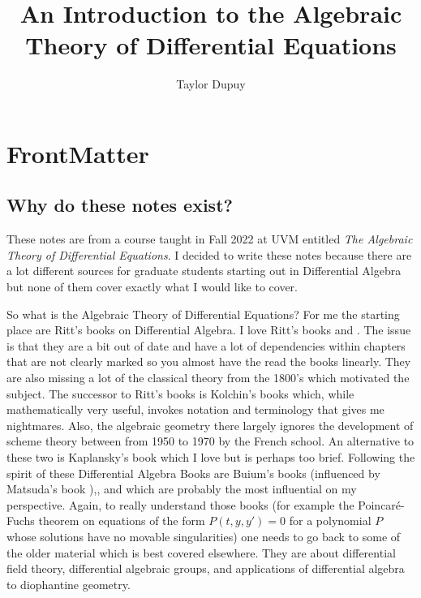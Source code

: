 \documentclass[12pt]{book}
\title{An Introduction to the Algebraic Theory of Differential Equations}
\author{Taylor Dupuy }
\numberwithin{equation}{section}
\theoremstyle{definition}
\theoremstyle{remark}
\begin{document}
\maketitle

\frontmatter

\tableofcontents

\chapter{FrontMatter}

\section{Why do these notes exist?}
These notes are from a course taught in Fall 2022 at UVM entitled \emph{The Algebraic Theory of Differential Equations}. 
I decided to write these notes because there are a lot different sources for graduate students starting out in Differential Algebra but none of them cover exactly what I would like to cover. 

So what is the Algebraic Theory of Differential Equations? 
For me the starting place are Ritt's books on Differential Algebra. 
I love Ritt's books \cite{Ritt1932} and \cite{Ritt1950}. 
The issue is that they are a bit out of date and have a lot of dependencies within chapters that are not clearly marked so you almost have the read the books linearly. 
They are also missing a lot of the classical theory from the 1800's which motivated the subject. 
The successor to Ritt's books is Kolchin's books \cite{Kolchin1973} which, while mathematically very useful, invokes notation and terminology that gives me nightmares. 
Also, the algebraic geometry there largely ignores the development of scheme theory between from 1950 to 1970 by the French school. 
An alternative to these two is Kaplansky's book \cite{Kaplansky1976} which I love but is perhaps too brief. 
Following the spirit of these Differential Algebra Books are Buium's books \cite{Buium1986} (influenced by Matsuda's book \cite{Matsuda1980}),\cite{Buium1992}, and \cite{Buium1994} which are probably the most influential on my perspective. 
Again, to really understand those books (for example the Poincar\'e-Fuchs theorem on equations of the form $P(t,y,y')=0$ for a polynomial $P$ whose solutions have no movable singularities) one needs to go back to some of the older material which is best covered elsewhere.
They are about differential field theory, differential algebraic groups, and applications of differential algebra to diophantine geometry.
\end{document}
